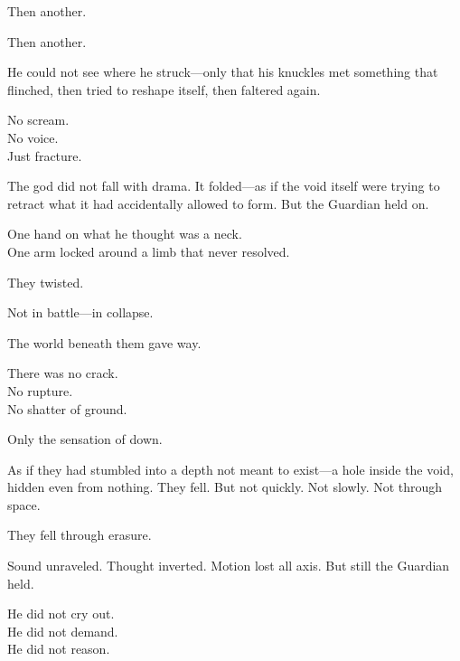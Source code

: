 \documentclass[9pt]{article}
\begin{document}
\vspace{0.5em}
Then another.

\vspace{0.5em}
Then another.

\vspace{0.5em}
He could not see where he struck---only that his knuckles met something that flinched, then tried to reshape itself, then faltered again.

\vspace{0.5em}
No scream.\\
No voice.\\
Just fracture.

\vspace{0.5em}
The god did not fall with drama. It folded---as if the void itself were trying to retract what it had accidentally allowed to form. But the Guardian held on.

\vspace{0.5em}
One hand on what he thought was a neck.\\
One arm locked around a limb that never resolved.

\vspace{0.5em}
They twisted.

\vspace{0.5em}
Not in battle---in collapse.

\vspace{0.5em}
The world beneath them gave way.

\vspace{0.5em}
There was no crack.\\
No rupture.\\
No shatter of ground.

\vspace{0.5em}
Only the sensation of down.

\vspace{0.5em}
As if they had stumbled into a depth not meant to exist---a hole inside the void, hidden even from nothing. They fell. But not quickly. Not slowly. Not through space.

\vspace{0.5em}
They fell through erasure.

\vspace{0.5em}
Sound unraveled. Thought inverted. Motion lost all axis. But still the Guardian held.

\vspace{0.5em}
He did not cry out.\\
He did not demand.\\
He did not reason.
\end{document}
